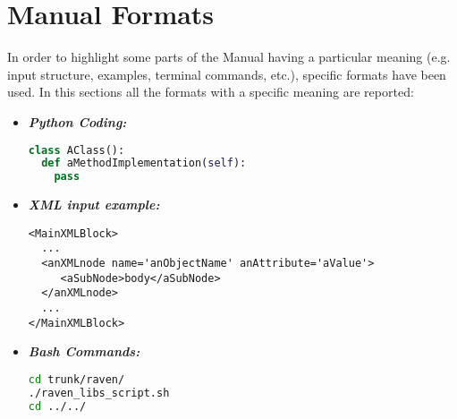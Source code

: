 \section{Manual Formats}
In order to highlight some parts of the Manual having a particular meaning (e.g. input structure, examples, terminal commands, etc.), specific formats have been used. In this sections all the formats with a specific meaning are reported:
\begin{itemize}
\item \textbf{\textit{Python Coding:}}
\begin{lstlisting}[language=python]
class AClass():
  def aMethodImplementation(self):
    pass
\end{lstlisting}
\item \textbf{\textit{XML input example:}}
\begin{lstlisting}[style=XML,morekeywords={anAttribute}]
<MainXMLBlock>
  ...
  <anXMLnode name='anObjectName' anAttribute='aValue'>
     <aSubNode>body</aSubNode>
  </anXMLnode>
  ...
</MainXMLBlock>
\end{lstlisting}
\item \textbf{\textit{Bash Commands:}}
\begin{lstlisting}[language=bash]
cd trunk/raven/
./raven_libs_script.sh
cd ../../
\end{lstlisting}
\end{itemize}


